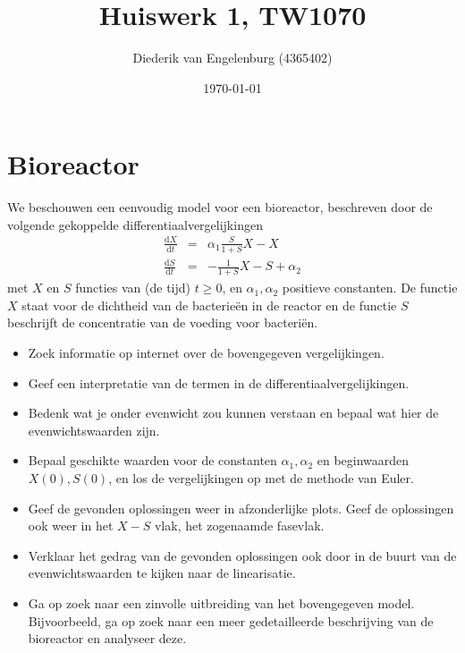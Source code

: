 \documentclass[a4paper, 11pt, leqno]{article}
\author{Diederik van Engelenburg (4365402)}
\title{Huiswerk 1, TW1070}
\date{\today}
\newcommand{ \dd }{\mathrm{d}}
\begin{document}
\section*{Bioreactor}

We beschouwen een eenvoudig model voor een bioreactor, beschreven door de volgende gekoppelde differentiaalvergelijkingen
\begin{eqnarray*}
	\frac{\dd X}{\dd t} &=& \alpha_1 \frac{S}{1 + S} X - X \\
	\frac{\dd S}{\dd t} &=& - \frac{1}{1 + S}X - S + \alpha_2
\end{eqnarray*}
met $X$ en $S$ functies van (de tijd) $t \geq 0$, en $\alpha_1, \alpha_2$ positieve constanten. De functie $X$ staat voor de dichtheid van de bacterie\"en in de reactor en de functie $S$ beschrijft de concentratie van de voeding voor bacteri\"en.

\begin{itemize}

\item Zoek informatie op internet over de bovengegeven vergelijkingen. 

\item Geef een interpretatie van de termen in de differentiaalvergelijkingen. 

\item Bedenk wat je onder evenwicht zou kunnen verstaan en bepaal wat hier de evenwichtswaarden zijn.

\item Bepaal geschikte waarden voor de constanten $\alpha_1, \alpha_2$ en beginwaarden $X(0), S(0)$, en los de vergelijkingen op met de methode van Euler. 

\item Geef de gevonden oplossingen weer in afzonderlijke plots. Geef de oplossingen ook weer in het $X-S$ vlak, het zogenaamde fasevlak. 

\item Verklaar het gedrag van de gevonden oplossingen ook door in de buurt van de evenwichtswaarden te kijken naar de linearisatie. 

\item Ga op zoek naar een zinvolle uitbreiding van het bovengegeven model. Bijvoorbeeld, ga op zoek naar een meer gedetailleerde beschrijving van de bioreactor en analyseer deze. 

\end{itemize}
\end{document}
